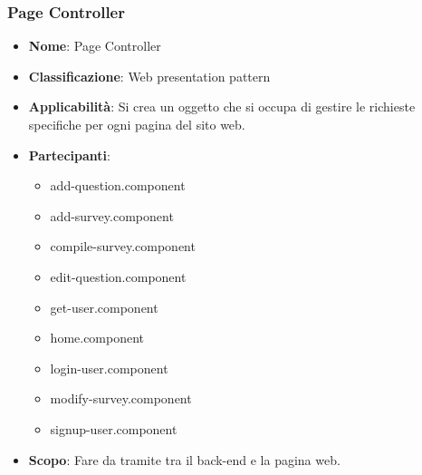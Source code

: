 \documentclass[12pt]{article}
\begin{document}
	\subsubsection{Page Controller} 
	\begin{itemize}
		\item \textbf{Nome}: Page Controller
		\item \textbf{Classificazione}: Web presentation pattern
		\item \textbf{Applicabilità}: Si crea un oggetto che si occupa di gestire le richieste specifiche per ogni pagina del sito web.
		\item \textbf{Partecipanti}:
		\begin{itemize}
			\item add-question.component
			\item add-survey.component
			\item compile-survey.component
			\item edit-question.component
			\item get-user.component
			\item home.component
			\item login-user.component
			\item modify-survey.component
			\item signup-user.component
		\end{itemize}
		\item \textbf{Scopo}: Fare da tramite tra il back-end e la pagina web.
	\end{itemize}
\end{document}
